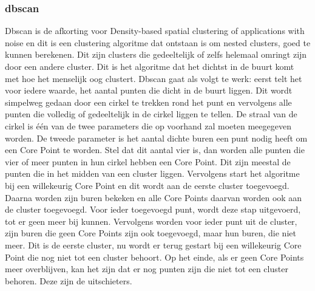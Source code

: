 \subsubsection{dbscan}
Dbscan is de afkorting voor Density-based spatial clustering of applications with noise en dit is een clustering algoritme dat ontstaan is om nested clusters, goed te kunnen berekenen. Dit zijn clusters die gedeeltelijk of zelfs helemaal omringt zijn door een andere cluster. Dit is het algoritme dat het dichtst in de buurt komt met hoe het menselijk oog clustert. Dbscan gaat als volgt te werk: eerst telt het voor iedere waarde, het aantal punten die dicht in de buurt liggen. Dit wordt simpelweg gedaan door een cirkel te trekken rond het punt en vervolgens alle punten die volledig of gedeeltelijk in de cirkel liggen te tellen. De straal van de cirkel is één van de twee parameters die op voorhand zal moeten meegegeven worden. De tweede parameter is het aantal dichte buren een punt nodig heeft om een Core Point te worden. Stel dat dit aantal vier is, dan worden alle punten die vier of meer punten in hun cirkel hebben een Core Point. Dit zijn meestal de punten die in het midden van een cluster liggen. Vervolgens start het algoritme bij een willekeurig Core Point en dit wordt aan de eerste cluster toegevoegd. Daarna worden zijn buren bekeken en alle Core Points daarvan worden ook aan de cluster toegevoegd. Voor ieder toegevoegd punt, wordt deze stap uitgevoerd, tot er geen meer bij kunnen. Vervolgens worden voor ieder punt uit de cluster, zijn buren die geen Core Points zijn ook toegevoegd, maar hun buren, die niet meer. Dit is de eerste cluster, nu wordt er terug gestart bij een willekeurig Core Point die nog niet tot een cluster behoort. Op het einde, als er geen Core Points meer overblijven, kan het zijn dat er nog punten zijn die niet tot een cluster behoren. Deze zijn de uitschieters.



%

